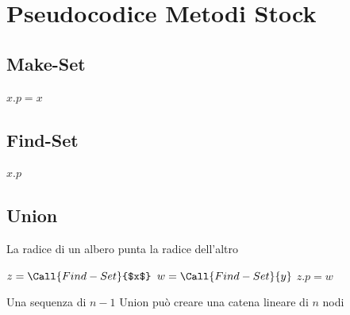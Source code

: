 \section{Pseudocodice Metodi Stock}


\subsection{Make-Set}
\begin{algorithmic}
        \State $x.p = x$
    \EndProcedure
\end{algorithmic}

\subsection{Find-Set}
\begin{algorithmic}
            \State \Return $x.p$

            \Else
                \State \Return {}
        \EndIf
    \EndProcedure
\end{algorithmic}


\subsection{Union}
La radice di un albero punta la radice dell'altro

\begin{algorithmic}
        \State $z = \Call{Find-Set}{$x$}$
        \State $w = \Call{Find-Set}{y}$
        \State $z.p = w$
    \EndProcedure
\end{algorithmic}

Una sequenza di $n-1$ Union può creare una catena lineare di $n$ nodi

